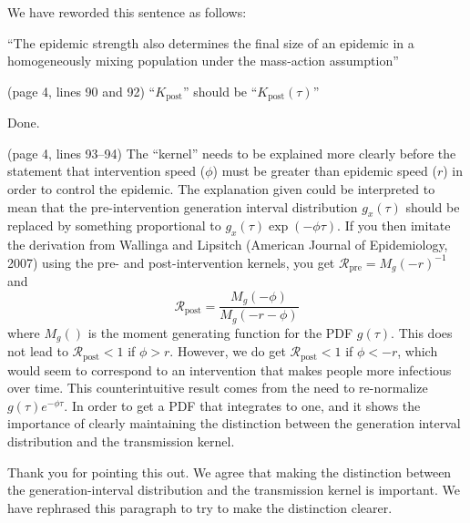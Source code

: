 \documentclass[12pt]{article}
\newcommand{\RR}{\ensuremath{{\mathcal R}}\xspace}
\newcommand{\revtext}{\textsf}
\begin{document}
We have reworded this sentence as follows:

``The epidemic strength also determines the final size of an epidemic in a homogeneously mixing population under the mass-action assumption''

\revtext{(page 4, lines 90 and 92) ``$K_{\mathrm{post}}$'' should be ``$K_{\mathrm{post}}(\tau)$''}

Done.

\revtext{(page 4, lines 93–94) The ``kernel'' needs to be explained more clearly before the statement that intervention speed ($\phi$) must be greater than epidemic speed ($r$) in order to control the epidemic. The explanation given could be interpreted to mean that the pre-intervention generation interval distribution $g_x(\tau)$ should be replaced by something proportional
to $g_x(\tau) \exp(-\phi \tau)$. If you then imitate the derivation from Wallinga and Lipsitch (American Journal of Epidemiology, 2007) using the pre- and post-intervention kernels, you get $\RR_{\textrm{pre}} = M_g(-r)^{-1}$ and $$\RR_{\textrm{post}} = \frac{M_g(-\phi)}{M_g(-r-\phi)}$$
where $M_g()$ is the moment generating function for the PDF $g(\tau)$. This
does not lead to $\RR_{\textrm{post}} < 1$ if $\phi > r$. However, we do get $\RR_{\textrm{post}} < 1$ if $\phi < -r$, which would seem to correspond to an intervention that makes people more infectious over time. 
This counterintuitive result comes from the need to re-normalize $g(\tau) e^{-\phi \tau}$.
In order to get a PDF that integrates to one, and it shows the importance of clearly maintaining the distinction between the generation interval distribution and the transmission kernel.}

Thank you for pointing this out. We agree that making the distinction between the generation-interval distribution and the transmission kernel is important. We have rephrased this paragraph to try to make the distinction clearer.
\end{document}
